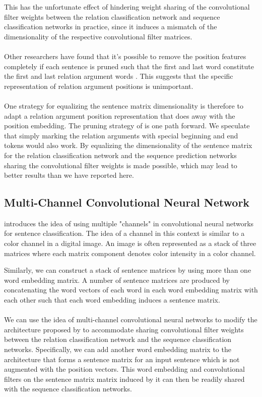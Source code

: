 This has the unfortunate effect of hindering weight sharing of the convolutional filter weights between the relation classification network and sequence classification networks in practice, since it induces a mismatch of the dimensionality of the respective convolutional filter matrices.
\\\\
Other researchers have found that it's possible to remove the position features completely if each sentence is pruned such that the first and last word constitute the first and last relation argument words \citep{santos2015}. This suggests that the specific representation of relation argument positions is unimportant.
\\\\
One strategy for equalizing the sentence matrix dimensionality is therefore to adapt a relation argument position representation that does away with the position embedding. The pruning strategy of \citep{santos2015} is one path forward. We speculate that simply marking the relation arguments with special beginning and end tokens would also work. By equalizing the dimensionality of the sentence matrix for the relation classification network and the sequence prediction networks sharing the convolutional filter weights is made possible, which may lead to better results than we have reported here.

\subsection{Multi-Channel Convolutional Neural Network}
\label{multi-channel}
\citet{kim2014} introduces the idea of using multiple "channels" in convolutional neural networks for sentence classification. The idea of a channel in this context is similar to a color channel in a digital image. An image is often represented as a stack of three matrices where each matrix component denotes color intensity in a color channel.

Similarly, we can construct a stack of sentence matrices by using more than one word embedding matrix. A number of sentence matrices are produced by concatenating the word vectors of each word in each word embedding matrix with each other such that each word embedding induces a sentence matrix.
\\\\
We can use the idea of multi-channel convolutional neural networks to modify the architecture proposed by \citet{nguyen2015} to accommodate sharing convolutional filter weights between the relation classification network and the sequence classification networks. Specifically, we can add another word embedding matrix to the architecture that forms a sentence matrix for an input sentence which is not augmented with the position vectors. This word embedding and convolutional filters on the sentence matrix matrix induced by it can then be readily shared with the sequence classification networks.

